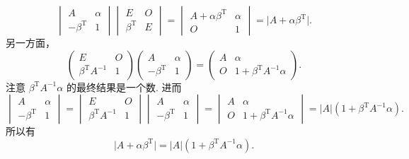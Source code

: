 \begin{exercise}
\begin{exgroup}
\begin{answer}
\[\begin{vmatrix}
                    A                   & \alpha \\
                    -\beta^{\mathrm{T}} & 1
                \end{vmatrix} \begin{vmatrix}
                    E                  & O \\
                    \beta^{\mathrm{T}} & E
                \end{vmatrix} = \begin{vmatrix}
                    A+\alpha \beta^{\mathrm{T}} & \alpha \\
                    O                           & 1
                \end{vmatrix} = \lvert A+\alpha \beta^{\mathrm{T}} \rvert.\]
            另一方面，
            \[\begin{pmatrix}
                    E                        & O \\
                    \beta^{\mathrm{T}}A^{-1} & 1
                \end{pmatrix} \begin{pmatrix}
                    A                   & \alpha \\
                    -\beta^{\mathrm{T}} & 1
                \end{pmatrix} = \begin{pmatrix}
                    A & \alpha                           \\
                    O & 1+\beta^{\mathrm{T}}A^{-1}\alpha
                \end{pmatrix}.\]
            注意 $\beta^{\mathrm{T}}A^{-1}\alpha$ 的最终结果是一个数. 进而
            \[\begin{vmatrix}
                    A                   & \alpha \\
                    -\beta^{\mathrm{T}} & 1
                \end{vmatrix} = \begin{vmatrix}
                    E                        & O \\
                    \beta^{\mathrm{T}}A^{-1} & 1
                \end{vmatrix} \begin{vmatrix}
                    A                   & \alpha \\
                    -\beta^{\mathrm{T}} & 1
                \end{vmatrix} = \begin{vmatrix}
                    A & \alpha                           \\
                    O & 1+\beta^{\mathrm{T}}A^{-1}\alpha
                \end{vmatrix} = \lvert A \rvert(1+\beta^{\mathrm{T}}A^{-1}\alpha).\]
            所以有
            \[\lvert A+\alpha \beta^{\mathrm{T}} \rvert = \lvert A \rvert(1+\beta^{\mathrm{T}}A^{-1}\alpha).\]
        \end{answer}


\end{exgroup}
\end{exercise}
